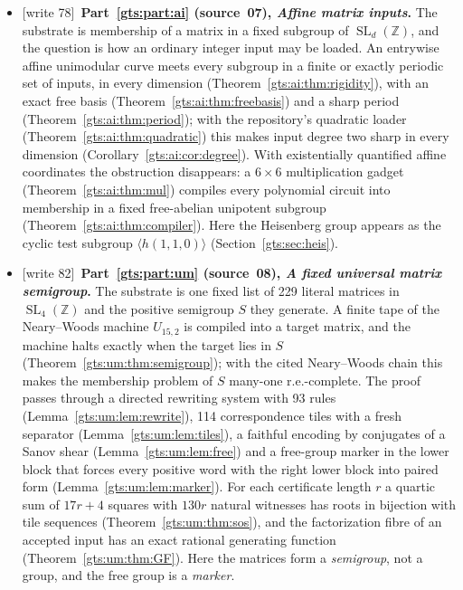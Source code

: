 \documentclass[11pt,letterpaper]{article}
\theoremstyle{definition}
\theoremstyle{remark}
\newcommand{\Z}{\mathbb Z}
\newcommand{\SL}{\operatorname{SL}}
\newcommand{\wtagb}{\textup{[write 78]}}
\newcommand{\wtagc}{\textup{[write 82]}}
\begin{document}
\begin{itemize}
\item \wtagb\ \textbf{Part~\ref{gts:part:ai} (source~07), \emph{Affine matrix inputs}.} The substrate is membership of a matrix in a fixed subgroup of $\SL_d(\Z)$, and the question is how an ordinary integer input may be loaded. An entrywise affine unimodular curve meets every subgroup in a finite or exactly periodic set of inputs, in every dimension (Theorem~\ref{gts:ai:thm:rigidity}), with an exact free basis (Theorem~\ref{gts:ai:thm:freebasis}) and a sharp period (Theorem~\ref{gts:ai:thm:period}); with the repository's quadratic loader (Theorem~\ref{gts:ai:thm:quadratic}) this makes input degree two sharp in every dimension (Corollary~\ref{gts:ai:cor:degree}). With existentially quantified affine coordinates the obstruction disappears: a $6\times6$ multiplication gadget (Theorem~\ref{gts:ai:thm:mul}) compiles every polynomial circuit into membership in a fixed free-abelian unipotent subgroup (Theorem~\ref{gts:ai:thm:compiler}). Here the Heisenberg group appears as the cyclic test subgroup $\langle h(1,1,0)\rangle$ (Section~\ref{gts:sec:heis}).
\item \wtagc\ \textbf{Part~\ref{gts:part:um} (source~08), \emph{A fixed universal matrix semigroup}.} The substrate is one fixed list of 229 literal matrices in $\SL_4(\Z)$ and the positive semigroup $S$ they generate. A finite tape of the Neary--Woods machine $U_{15,2}$ is compiled into a target matrix, and the machine halts exactly when the target lies in $S$ (Theorem~\ref{gts:um:thm:semigroup}); with the cited Neary--Woods chain this makes the membership problem of $S$ many-one r.e.-complete. The proof passes through a directed rewriting system with 93 rules (Lemma~\ref{gts:um:lem:rewrite}), 114 correspondence tiles with a fresh separator (Lemma~\ref{gts:um:lem:tiles}), a faithful encoding by conjugates of a Sanov shear (Lemma~\ref{gts:um:lem:free}) and a free-group marker in the lower block that forces every positive word with the right lower block into paired form (Lemma~\ref{gts:um:lem:marker}). For each certificate length $r$ a quartic sum of $17r+4$ squares with $130r$ natural witnesses has roots in bijection with tile sequences (Theorem~\ref{gts:um:thm:sos}), and the factorization fibre of an accepted input has an exact rational generating function (Theorem~\ref{gts:um:thm:GF}). Here the matrices form a \emph{semigroup}, not a group, and the free group is a \emph{marker}.

\end{itemize}
\end{document}
